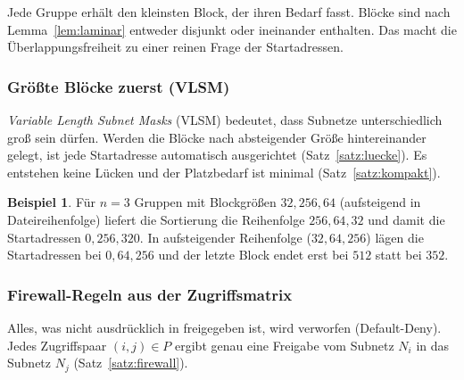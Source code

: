 \documentclass[a4paper,12pt]{article}
\theoremstyle{definition}
\newtheorem{beispiel}{Beispiel}
\newcommand{\code}[1]{\texttt{\detokenize{#1}}}
\begin{document}
Jede Gruppe erhält den kleinsten Block, der ihren Bedarf fasst. Blöcke sind nach Lemma~\ref{lem:laminar} entweder disjunkt oder ineinander enthalten. Das macht die Überlappungsfreiheit zu einer reinen Frage der Startadressen.

\subsubsection{Größte Blöcke zuerst (VLSM)}

\emph{Variable Length Subnet Masks} (VLSM) bedeutet, dass Subnetze unterschiedlich groß sein dürfen. Werden die Blöcke nach absteigender Größe hintereinander gelegt, ist jede Startadresse automatisch ausgerichtet (Satz~\ref{satz:luecke}). Es entstehen keine Lücken und der Platzbedarf ist minimal (Satz~\ref{satz:kompakt}).

\begin{beispiel}
	Für $n=3$ Gruppen mit Blockgrößen $32, 256, 64$ (aufsteigend in Dateireihenfolge) liefert die Sortierung die Reihenfolge $256, 64, 32$ und damit die Startadressen $0, 256, 320$. In aufsteigender Reihenfolge ($32, 64, 256$) lägen die Startadressen bei $0, 64, 256$ und der letzte Block endet erst bei $512$ statt bei $352$.
\end{beispiel}

\subsubsection{Firewall-Regeln aus der Zugriffsmatrix}

Alles, was nicht ausdrücklich in \code{access} freigegeben ist, wird verworfen (Default-Deny). Jedes Zugriffspaar $(i,j) \in P$ ergibt genau eine Freigabe vom Subnetz $N_i$ in das Subnetz $N_j$ (Satz~\ref{satz:firewall}).
\end{document}
